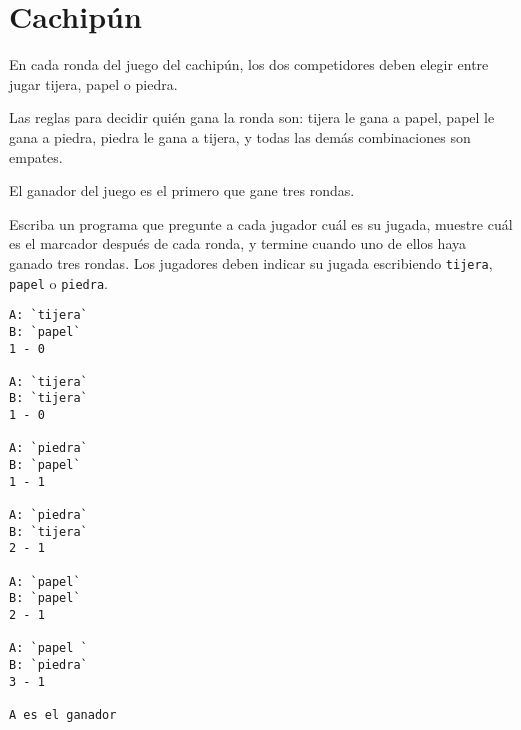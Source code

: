\section{Cachipún}

En cada ronda del juego del cachipún, los dos competidores deben elegir
entre jugar tijera, papel o piedra.

Las reglas para decidir quién gana la ronda son: tijera le gana a papel,
papel le gana a piedra, piedra le gana a tijera, y todas las demás
combinaciones son empates.

El ganador del juego es el primero que gane tres rondas.

Escriba un programa que pregunte a cada jugador cuál es su jugada,
muestre cuál es el marcador después de cada ronda, y termine cuando uno
de ellos haya ganado tres rondas. Los jugadores deben indicar su jugada
escribiendo \lstinline!tijera!, \lstinline!papel! o \lstinline!piedra!.

\begin{lstlisting}[language=testcase]
A: `tijera`
B: `papel`
1 - 0

A: `tijera`
B: `tijera`
1 - 0

A: `piedra`
B: `papel`
1 - 1

A: `piedra`
B: `tijera`
2 - 1

A: `papel`
B: `papel`
2 - 1

A: `papel `
B: `piedra`
3 - 1

A es el ganador
\end{lstlisting}
